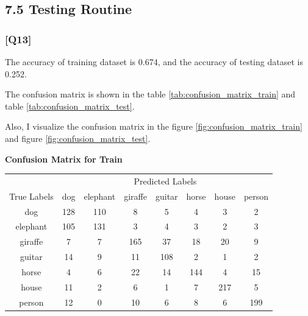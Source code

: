 \documentclass{article}
\begin{document}
\subsection*{7.5 Testing Routine}

\subsubsection*{[Q13]}

The accuracy of training dataset is 0.674, and the accuracy of testing dataset is 0.252.

The confusion matrix is shown in the table \ref{tab:confusion_matrix_train} and table \ref{tab:confusion_matrix_test}.

Also, I visualize the confusion matrix in the figure \ref{fig:confusion_matrix_train} and figure \ref{fig:confusion_matrix_test}.

\begin{center}
    \textbf{Confusion Matrix for Train}
    
    \begin{tabular}{c|ccccccc}
    \toprule
    & \multicolumn{7}{c}{Predicted Labels} \\
    \cmidrule(lr){2-8}
    True Labels & dog & elephant & giraffe & guitar & horse & house & person \\
    \midrule
    dog & 128 & 110 & 8 & 5 & 4 & 3 & 2 \\
    elephant & 105 & 131 & 3 & 4 & 3 & 2 & 3 \\
    giraffe & 7 & 7 & 165 & 37 & 18 & 20 & 9 \\
    guitar & 14 & 9 & 11 & 108 & 2 & 1 & 2 \\
    horse & 4 & 6 & 22 & 14 & 144 & 4 & 15 \\
    house & 11 & 2 & 6 & 1 & 7 & 217 & 5 \\
    person & 12 & 0 & 10 & 6 & 8 & 6 & 199 \\
    \bottomrule
    \end{tabular}
    \label{tab:confusion_matrix_train}
    \end{center}
    
\end{document}
